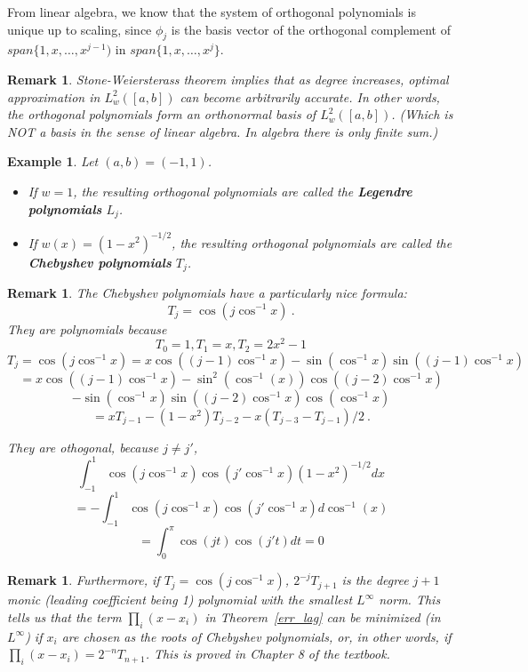 \documentclass[20pt]{article} %
\theoremstyle{break}
\newtheorem{exa}[definition]{Example}
\newtheorem{rem}[definition]{Remark}
\begin{document}
\newpage

From linear algebra, we know that the system of orthogonal polynomials is unique up to scaling, since $\phi_j$ is the basis vector of the orthogonal complement of $span\{1, x, \dots, x^{j-1})$ in $span\{1, x, \dots, x^j\}$.\\


 \begin{rem}Stone-Weiersterass theorem implies that as degree increases, optimal approximation in $L^2_w([a, b])$ can become arbitrarily accurate. In other words, the orthogonal polynomials form an orthonormal basis of $L^2_w([a, b])$. (Which is NOT a basis in the sense of linear algebra. In algebra there is only finite sum.)
 \end{rem}

\newpage

\begin{exa}
  Let $(a, b)=(-1, 1)$.
  \begin{itemize}
  \item If $w=1$, the resulting orthogonal polynomials are called the {\bf Legendre polynomials} $L_j$.
  \item If $w(x)=(1-x^2)^{-1/2}$, the resulting orthogonal polynomials are called the {\bf Chebyshev polynomials} $T_j$. 
  \end{itemize}
 \end{exa}

 \begin{rem}
The Chebyshev polynomials have a particularly nice formula:
\[T_j=\cos(j\cos^{-1}x)\ .\]
They are polynomials because
\[T_0=1, T_1=x, T_2=2x^2-1\]
\[T_j=\cos(j\cos^{-1}x)=x\cos((j-1)\cos^{-1}x)-\sin(\cos^{-1}x)\sin((j-1)\cos^{-1}x)\]
\[=x\cos((j-1)\cos^{-1}x)-\sin^2(\cos^{-1}(x))\cos((j-2)\cos^{-1}x)\]
\[-\sin(\cos^{-1}x)\sin((j-2)\cos^{-1}x)\cos(\cos^{-1}x)\]
\[=xT_{j-1}-(1-x^2)T_{j-2}-x(T_{j-3}-T_{j-1})/2\ .\]

\newpage

 They are othogonal, because $j\not=j'$,
\[\int_{-1}^1 \cos(j\cos^{-1}x)\cos(j'\cos^{-1}x)(1-x^2)^{-1/2}dx\]
\[=-\int_{-1}^{1}\cos(j\cos^{-1}x)\cos(j'\cos^{-1}x)d\cos^{-1}(x)\]
\[=\int_0^\pi\cos(jt)\cos(j't)dt=0\]
\end{rem}

\begin{rem}Furthermore, if $T_j=\cos(j\cos^{-1}x)$, $2^{-j}T_{j+1}$ is the degree $j+1$ monic (leading coefficient being 1) polynomial with the smallest $L^\infty$ norm. This tells us that the term $\prod_i(x-x_i)$ in Theorem~\ref{err_lag} can be minimized (in $L^\infty$) if $x_i$ are chosen as the roots of Chebyshev polynomials, or, in other words, if $\prod_i(x-x_i)=2^{-n}T_{n+1}$. This is proved in Chapter 8 of the textbook.
\end{rem}
\end{document}
